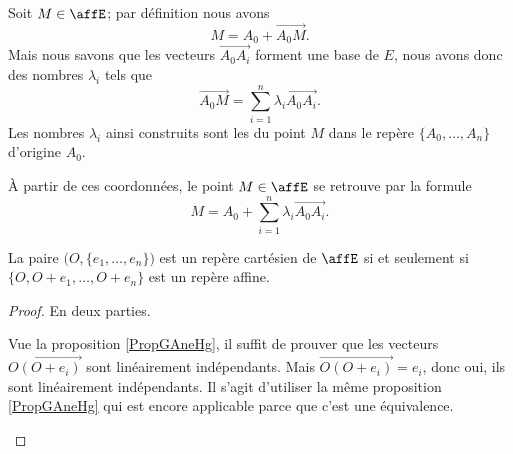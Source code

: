 Soit \( M\in \affE\); par définition nous avons
\begin{equation}
	M=A_0+\overrightarrow{ A_0M }.
\end{equation}
Mais nous savons que les vecteurs \( \overrightarrow{ A_0A_i }\) forment une base de \( E\), nous avons donc des nombres \( \lambda_i\) tels que
\begin{equation}
	\overrightarrow{ A_0M }=\sum_{i=1}^n\lambda_i\overrightarrow{ A_0A_i }.
\end{equation}
Les nombres \( \lambda_i\) ainsi construits sont les  du point \( M\) dans le repère \( \{ A_0,\ldots, A_n \}\) d'origine \( A_0\).

À partir de ces coordonnées, le point \( M\in\affE\) se retrouve par la formule
\begin{equation}
	M=A_0+\sum_{i=1}^n\lambda_i\overrightarrow{ A_0A_i }.
\end{equation}

\begin{proposition}      \label{PROPooIXVBooPpKsDE}
	La paire \( \big( O,\{ e_1,\ldots, e_n \} \big)\) est un repère cartésien de \( \affE\) si et seulement si \( \{ O,O+e_1,\ldots, O+e_n \}\) est un repère affine.
\end{proposition}

\begin{proof}
	En deux parties.
	\begin{subproof}
		Vue la proposition \ref{PropGAneHg}, il suffit de prouver que les vecteurs \( \overrightarrow{O(O+e_i)}\) sont linéairement indépendants. Mais \( \overrightarrow{O(O+e_i)}=e_i\), donc oui, ils sont linéairement indépendants.
		Il s'agit d'utiliser la même proposition \ref{PropGAneHg} qui est encore applicable parce que c'est une équivalence.
	\end{subproof}
\end{proof}

